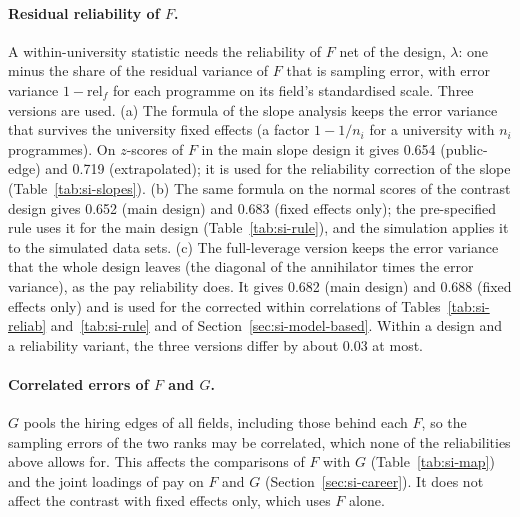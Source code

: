 \documentclass[11pt]{article}
\begin{document}
\paragraph{Residual reliability of $F$.} A within-university statistic needs the reliability of $F$ net of the design,
$\lambda$: one minus the share of the residual variance of $F$ that is sampling error, with error variance
$1-\mathrm{rel}_f$ for each programme on its field's standardised scale. Three versions are used. (a) The formula
of the slope analysis keeps the error variance that survives the university fixed effects (a factor $1-1/n_i$ for a
university with $n_i$ programmes). On $z$-scores of $F$ in the main slope design it gives 0.654 (public-edge) and 0.719
(extrapolated); it is used for the reliability correction of the slope (Table~\ref{tab:si-slopes}). (b) The same
formula on the normal scores of the contrast design gives 0.652 (main design) and 0.683 (fixed effects only); the
pre-specified rule uses it for the main design (Table~\ref{tab:si-rule}), and the simulation applies it to the
simulated data sets. (c) The full-leverage version keeps the error variance that the whole design leaves (the
diagonal of the annihilator times the error variance), as the pay reliability does. It gives 0.682 (main design) and
0.688 (fixed effects only) and is used for the corrected within correlations of Tables~\ref{tab:si-reliab}
and~\ref{tab:si-rule} and of Section~\ref{sec:si-model-based}. Within a design and a reliability variant, the three
versions differ by about 0.03 at most.

\paragraph{Correlated errors of $F$ and $G$.} $G$ pools the hiring edges of all fields, including those behind each
$F$, so the sampling errors of the two ranks may be correlated, which none of the reliabilities above allows for. This
affects the comparisons of $F$ with $G$ (Table~\ref{tab:si-map}) and the joint loadings of pay on $F$ and $G$
(Section~\ref{sec:si-career}). It does not affect the contrast with fixed effects only, which uses $F$ alone.
\end{document}
